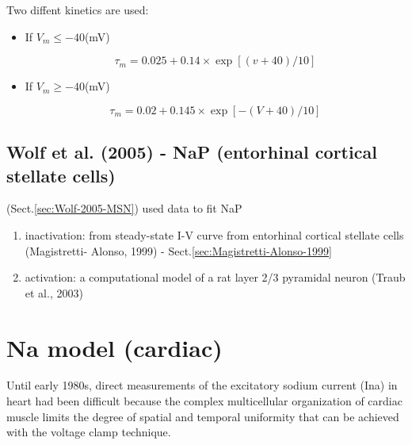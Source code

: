 Two diffent kinetics are used:
\begin{itemize}
  \item If $V_m \le -40$(mV)
  
\begin{equation}
\tau_m = 0.025 + 0.14 \times \exp[(v + 40)/10]
\end{equation}
  
  \item If $V_m \ge -40$(mV)

\begin{equation}
\tau_m = 0.02 + 0.145 \times \exp[-(V+40)/10]
\end{equation}
\end{itemize}

\section{Wolf et al. (2005) - NaP (entorhinal cortical stellate cells)}
\label{sec:NaP-Wolf-2005}

\citep{wolf2005} (Sect.\ref{sec:Wolf-2005-MSN}) used data to fit NaP 
\begin{enumerate}
  \item inactivation: from steady-state I-V curve from entorhinal cortical
  stellate cells (Magistretti- Alonso, 1999) - Sect.\ref{sec:Magistretti-Alonso-1999}
  
  \item activation: a computational model of a rat layer 2/3 pyramidal neuron
  (Traub et al., 2003)
\end{enumerate}


\chapter{Na model (cardiac)}

Until early 1980s, direct measurements of the excitatory sodium current (Ina) in
heart had been difficult because the complex multicellular organization of
cardiac muscle limits the degree of spatial and temporal uniformity that can be
achieved with the voltage clamp technique.

